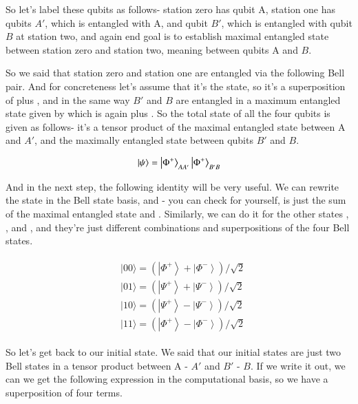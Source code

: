 So let's label these qubits as follows- station zero has qubit A, station one has qubits  $A'$, which is entangled with A, and qubit $B'$, which is entangled with qubit $B$ at station two, and again end goal is to establish maximal entangled state between station zero and station two, meaning between qubits A and  $B$.

So we said that station zero and station one are entangled via the following Bell pair. And for concreteness let's assume that it's the  \ket{\Phi^+} state, so it's a superposition of  plus , and in the same way $B'$ and $B$ are entangled in a maximum entangled state given by  \ket{\Phi^+} which is again  plus . So the total state of all the four qubits is given as follows- it's a tensor product of the maximal entangled state  \ket{\Phi^+} between A and  $A'$, and the maximally entangled state  \ket{\Phi^+} between qubits $B'$ and  $B$.

\begin{align}
    \left| \psi \right\rangle=\left| \Phi^{+} \right\rangle_{A A^{\prime}}\left| \Phi^{+} \right\rangle_{B^{\prime} B}
\end{align}

And in the next step, the following identity will be very useful. We can rewrite the state  in the Bell state basis, and - you can check for yourself, is just the sum of the maximal entangled state  \ket{\Phi^+} and \ket. Similarly, we can do it for the other states , , and , and they're just different combinations and superpositions of the four Bell states.

\begin{align}
    \begin{aligned}
&|00\rangle=\left(\left|\Phi^{+}\right\rangle+\left|\Phi^{-}\right\rangle\right) / \sqrt{2} \\
&|01\rangle=\left(\left|\Psi^{+}\right\rangle+\left|\Psi^{-}\right\rangle\right) / \sqrt{2} \\
&|10\rangle=\left(\left|\Psi^{+}\right\rangle-\left|\Psi^{-}\right\rangle\right) / \sqrt{2} \\
&|11\rangle=\left(\left|\Phi^{+}\right\rangle-\left|\Phi^{-}\right\rangle\right) / \sqrt{2}
\end{aligned}
\end{align}

So let's get back to our initial state. We said that our initial states are just two Bell states  \ket{\Phi^+} in a tensor product between A -  $A'$ and $B'$ -  $B$. If we write it out, we can we get the following expression in the computational basis, so we have a superposition of four terms. 

